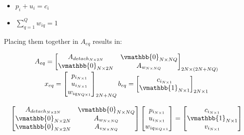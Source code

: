 \documentclass[letterpaper, 10pt, conference]{IEEEtran}
\begin{document}
\begin{itemize}
\item
  \(p_i + u_i = c_i\)
\item
  \(\sum_{q=1}^Q w_{iq} = 1\)
\end{itemize}

Placing them together in \(A_{eq}\) results in:

\begin{equation}
\begin{array}{c}
    A_{eq} =
    \begin{bmatrix}
        A_{detach_{N \times 2N}} & \vmathbb{0}_{N \times NQ} \\
        \vmathbb{0}_{N \times 2N} & A_{w_{N \times NQ}}      \\
    \end{bmatrix}_{2N \times (2N + NQ)} \\
    x_{eq} =
    \begin{bmatrix}
        p_{i_{N \times 1}} \\
        u_{i_{N \times 1}} \\
        w_{iq_{NQ \times 1}} \\
    \end{bmatrix}_{2N + NQ}
    b_{eq} =
    \begin{bmatrix}
        c_{i_{N \times 1}} \\
        \vmathbb{1}_{N \times 1} \\
    \end{bmatrix}_{2N \times 1} \\
    \\
    \begin{bmatrix}
        A_{detach_{N \times 2N}}    & \vmathbb{0}_{N \times NQ} \\
        \vmathbb{0}_{N \times 2N} & A_{w_{N \times NQ}}          \\
        \vmathbb{0}_{N \times 2N} & A_{v_{N \times NQ}}          \\
    \end{bmatrix}
    \begin{bmatrix}
        p_{i_{N \times 1}} \\
        u_{i_{N \times 1}} \\
        w_{iq_{NQ \times 1}} \\
    \end{bmatrix}
    =
    \begin{bmatrix}
        c_{i_{N \times 1}} \\
        \vmathbb{1}_{N \times 1} \\
        v_{i_{N \times 1}} \\
    \end{bmatrix}
\end{array}
\end{equation}
\end{document}
